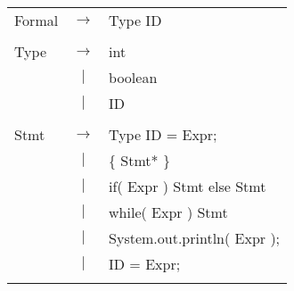 \documentclass{article}
\begin{document}
\begin{tabular}{ l c l }
	Formal & $\rightarrow$ & Type ID\\
	\\

	Type & $\rightarrow$ & int\\
	&$|$& boolean \\
	&$|$& ID \\
	\\

	Stmt  & $\rightarrow$ & Type ID = Expr; \\
	&$|$& \{ Stmt* \} \\
	&$|$& if( Expr ) Stmt else Stmt \\
	&$|$& while( Expr ) Stmt\\
	&$|$& System.out.println( Expr ); \\
	&$|$& ID = Expr; \\
	\\

\end{tabular}
\end{document}
